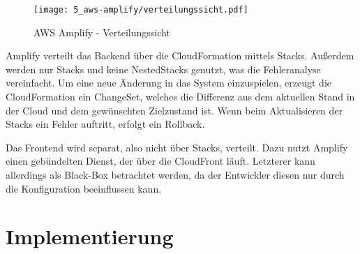 \begin{figure}
  \centering
  \texttt{[image: 5\_aws-amplify/verteilungssicht.pdf]}
  \caption{AWS Amplify - Verteilungssicht}
  \label{Amplify:verteilungssicht}
\end{figure}

Amplify verteilt das Backend über die CloudFormation mittels Stacks. Außerdem werden nur Stacks und keine NestedStacks genutzt, was die Fehleranalyse vereinfacht. Um eine neue Änderung in das System einzuspielen, erzeugt die CloudFormation ein ChangeSet, welches die Differenz aus dem aktuellen Stand in der Cloud und dem gewünschten Zielzustand ist. Wenn beim Aktualisieren der Stacks ein Fehler auftritt, erfolgt ein Rollback.

Das Frontend wird separat, also nicht über Stacks, verteilt. Dazu nutzt Amplify einen gebündelten Dienst, der über die CloudFront läuft. Letzterer kann allerdings als Black-Box betrachtet werden, da der Entwickler diesen nur durch die Konfiguration beeinflussen kann.

\section{Implementierung}

